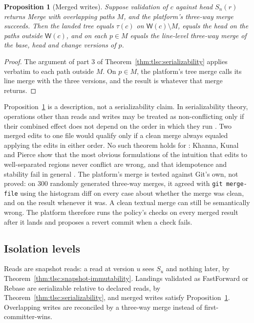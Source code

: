 \documentclass[11pt,letterpaper]{article}
\newtheorem{proposition}[theorem]{Proposition}
\theoremstyle{definition}
\theoremstyle{remark}
\newcommand{\W}{\mathsf{W}}
\newcommand{\Snap}[1]{S_{#1}}
\newcommand{\tree}{\tau}
\begin{document}
\begin{proposition}[Merged writes]
\label{prop:tlsc:merge}
Suppose validation of $c$ against head $\Snap{n}(r)$ returns Merge with overlapping paths $M$, and the platform's three-way merge succeeds. Then the landed tree equals $\tree(c)$ on $\W(c)\setminus M$, equals the head on the paths outside $\W(c)$, and on each $p\in M$ equals the line-level three-way merge of the base, head and change versions of $p$.
\end{proposition}

\begin{proof}
The argument of part 3 of Theorem~\ref{thm:tlsc:serializability} applies verbatim to each path outside $M$. On $p\in M$, the platform's tree merge calls its line merge with the three versions, and the result is whatever that merge returns.
\end{proof}

Proposition~\ref{prop:tlsc:merge} is a description, not a serializability claim. In serializability theory, operations other than reads and writes may be treated as non-conflicting only if their combined effect does not depend on the order in which they run \cite[Section 2.5]{bhg1987}. Two merged edits to one file would qualify only if a clean merge always equaled applying the edits in either order. No such theorem holds for : Khanna, Kunal and Pierce show that the most obvious formulations of the intuition that edits to well-separated regions never conflict are wrong, and that idempotence and stability fail in general \cite{khanna2007diff3}. The platform's merge is tested against Git's own, not proved: on 300 randomly generated three-way merges, it agreed with \texttt{\small git merge-file} using the histogram diff on every case about whether the merge was clean, and on the result whenever it was. %
A clean textual merge can still be semantically wrong. The platform therefore runs the policy's checks on every merged result after it lands and proposes a revert commit when a check fails.

\subsection{Isolation levels}
\label{sec:tlsc:isolation}

Reads are snapshot reads: a read at version $u$ sees $\Snap{u}$ and nothing later, by Theorem~\ref{thm:tlsc:snapshot-immutability}. Landings validated as FastForward or Rebase are serializable relative to declared reads, by Theorem~\ref{thm:tlsc:serializability}, and merged writes satisfy Proposition~\ref{prop:tlsc:merge}. Overlapping writes are reconciled by a three-way merge instead of first-committer-wins.
\end{document}
